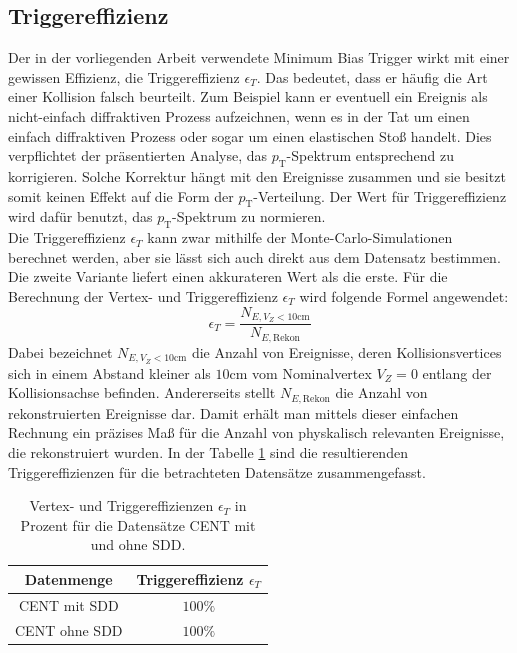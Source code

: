 \documentclass[12pt,a4paper]{report}
\begin{document}
\subsection{Triggereffizienz}
Der in der vorliegenden Arbeit verwendete Minimum Bias Trigger wirkt mit einer gewissen Effizienz, die Triggereffizienz $\epsilon_{T}$. Das bedeutet, dass er häufig die Art einer Kollision falsch beurteilt. Zum Beispiel kann er eventuell ein Ereignis als nicht-einfach diffraktiven Prozess aufzeichnen, wenn es in der Tat um einen einfach diffraktiven Prozess oder sogar um einen elastischen Stoß handelt. Dies verpflichtet der präsentierten Analyse, das $p_{\mathrm{T}}$-Spektrum entsprechend zu korrigieren. Solche Korrektur hängt mit den Ereignisse zusammen und sie besitzt somit keinen Effekt auf die Form der $p_{\mathrm{T}}$-Verteilung. Der Wert für Triggereffizienz wird dafür benutzt, das $p_{\mathrm{T}}$-Spektrum zu normieren.\\
Die Triggereffizienz $\epsilon_{T}$ kann zwar mithilfe der Monte-Carlo-Simulationen berechnet werden, aber sie lässt sich auch direkt aus dem Datensatz bestimmen. Die zweite Variante liefert einen akkurateren Wert als die erste. Für die Berechnung der Vertex- und Triggereffizienz $\epsilon_{T}$ wird folgende Formel angewendet:\\
\begin{equation}
\epsilon_{T}=\dfrac{N_{E, V_{Z}<10\mathrm{cm}}}{N_{E, \mathrm{Rekon}}}
\end{equation}
Dabei bezeichnet $N_{E, V_{Z}<10\mathrm{cm}}	$ die Anzahl von Ereignisse, deren Kollisionsvertices sich in einem Abstand kleiner als $10\mathrm{cm}$ vom Nominalvertex $V_{Z} = 0$ entlang der Kollisionsachse befinden. Andererseits stellt $N_{E, \mathrm{Rekon}}$ die Anzahl von rekonstruierten Ereignisse dar. Damit erhält man mittels dieser einfachen Rechnung ein präzises Maß für die Anzahl von physkalisch relevanten Ereignisse, die rekonstruiert wurden. In der Tabelle \ref{tab:Trigger} sind die resultierenden Triggereffizienzen für die betrachteten Datensätze zusammengefasst.
\begin{table}
\centering
\begin{tabular}{|c||c|}
\hline
\textbf{Datenmenge} & \textbf{Triggereffizienz  $\epsilon_{T}$} \\
\hline
\hline
CENT mit SDD & $100\%$  \\ 
\hline
CENT ohne SDD & $100\%$ \\ 
\hline
\end{tabular}
\caption{Vertex- und Triggereffizienzen $\epsilon_{T}$ in Prozent für die Datensätze CENT mit und ohne SDD.}
\label{tab:Trigger}
\end{table} 
\end{document}
